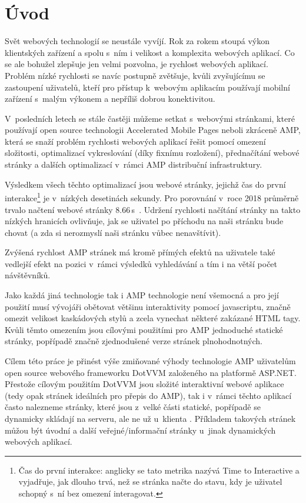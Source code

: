 \chapter{Úvod}

Svět webových technologií se neustále vyvíjí. Rok za rokem stoupá výkon klientských zařízení a spolu
s~ním i velikost a komplexita webových aplikací. Co se ale bohužel zlepšuje jen velmi pozvolna, je rychlost
webových aplikací. Problém nízké rychlosti se navíc postupně zvětšuje, kvůli zvyšujícímu se zastoupení
uživatelů, kteří pro přístup k~webovým aplikacím používají mobilní zařízení s~malým výkonem a nepříliš
dobrou konektivitou.

V~posledních letech se stále častěji můžeme setkat s~webovými stránkami, které používají open source technologii Accelerated Mobile Pages neboli zkráceně AMP, která se snaží problém rychlosti webových aplikací
řešit pomocí omezení složitosti, optimalizací vykreslování (díky fixnímu rozložení), přednačítání webové
stránky a dalších optimalizací v~rámci AMP distribuční infrastruktury.

Výsledkem všech těchto optimalizací jsou webové stránky, jejichž čas do první interakce\footnote{Čas do první interakce: anglicky se tato metrika nazývá Time to Interactive a vyjadřuje, jak dlouho trvá, než se stránka načte do stavu, kdy je uživatel schopný s~ní bez omezení interagovat.} je v~nízkých desetinách sekundy. Pro porovnání v~roce 2018 průměrně trvalo načtení webové
stránky 8.66\,s~\cite{TTI}.
Udržení rychlosti načítání stránky na takto nízkých hranicích ovlivňuje, jak se uživatel po příchodu na naši
stránku bude chovat (a zda si nerozmyslí naši stránku vůbec nenavštívit).

Zvýšená rychlost AMP stránek má kromě přímých efektů na uživatele také vedlejší efekt na pozici
v~rámci výsledků vyhledávání a tím i na větší počet návštěvníků.

Jako každá jiná technologie tak i AMP technologie není všemocná a pro její použití musí vývojáři
obětovat většinu interaktivity pomocí javascriptu, značně omezit velikost kaskádových stylů a zcela
vynechat některé zakázané HTML tagy. Kvůli těmto omezením jsou cílovými použitími pro AMP jednoduché statické stránky, popřípadě značně
zjednodušené verze stránek plnohodnotných.

Cílem této práce je přinést výše zmiňované výhody technologie AMP uživatelům open source webového
frameworku DotVVM založeného na platformě ASP.NET.
Přestože cílovým použitím DotVVM jsou složité interaktivní webové aplikace (tedy opak stránek ideálních pro přepis do AMP), tak i v~rámci těchto aplikací často nalezneme stránky, které jsou z~velké části statické, popřípadě se dynamicky skládají na serveru, ale ne už u~klienta \cite{DotVVMIntro}. Příkladem takových stránek můžou být úvodní a další veřejné/informační stránky u~jinak dynamických webových aplikací. 

